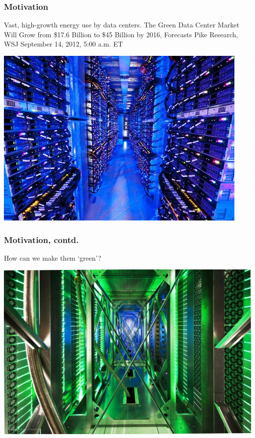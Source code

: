 \documentclass[xcolor=dvipsnames]{beamer}
\begin{document}
\begin{frame}
\frametitle{Motivation}
\begin{block}
{Vast, high-growth energy use by data centers.}
The Green Data Center Market Will Grow from \$17.6 Billion to \$45 Billion by 2016, Forecasts Pike Research, WSJ September 14, 2012, 5:00 a.m. ET  

\includegraphics[scale = 0.6]{datacenter.jpg}

\end{block}
\end{frame}
%
%
\begin{frame}
\frametitle{Motivation, contd.}
\begin{block}
{How can we make them `green'?}

\includegraphics[scale = 0.15]{green.jpg}

\end{block}
\end{frame}
%
\end{document}
